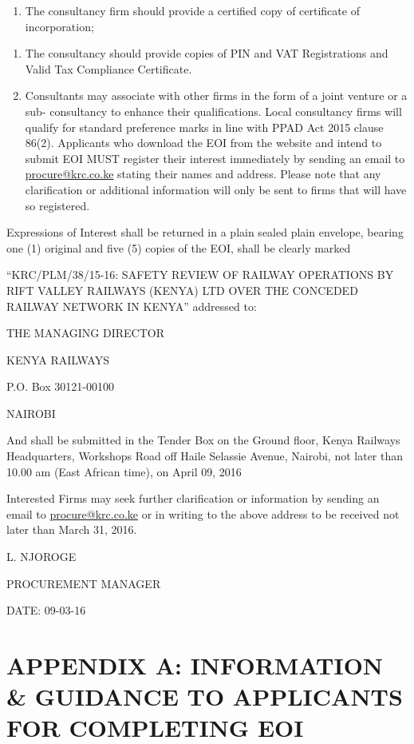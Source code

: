 \begin{enumerate}
	\item 	The consultancy firm should provide a certified copy of certificate of 	incorporation;
\end{enumerate}

\begin{enumerate}
	\item	The consultancy should provide copies of PIN and VAT Registrations and
	Valid Tax Compliance Certificate.
	\item	Consultants may associate with other firms in the form of a joint
	venture or a sub- consultancy to enhance their qualifications. Local
	consultancy firms will qualify for standard preference marks in line
	with PPAD Act 2015 clause 86(2). Applicants who download the EOI from
	the website and intend to submit EOI MUST register their interest
	immediately by sending an email to
	\href{mailto:procure@krc.co.ke}{procure@krc.co.ke} stating their names
	and address. Please note that any clarification or additional
	information will only be sent to firms that will have so registered.
\end{enumerate}

Expressions of Interest shall be returned in a plain sealed plain
envelope, bearing one (1) original and five (5) copies of the EOI, shall
be clearly marked

``KRC/PLM/38/15-16: SAFETY REVIEW OF RAILWAY OPERATIONS BY RIFT VALLEY
RAILWAYS (KENYA) LTD OVER THE CONCEDED RAILWAY NETWORK IN KENYA''
addressed to:

THE MANAGING DIRECTOR

KENYA RAILWAYS

P.O. Box 30121-00100

NAIROBI

And shall be submitted in the Tender Box on the Ground floor, Kenya
Railways Headquarters, Workshops Road off Haile Selassie Avenue,
Nairobi, not later than 10.00 am (East African time), on April 09, 2016

Interested Firms may seek further clarification or information by
sending an email to \href{mailto:procure@krc.co.ke}{procure@krc.co.ke}
or in writing to the above address to be received not later than March
31, 2016.

L. NJOROGE

PROCUREMENT MANAGER

DATE: 09-03-16

\section{APPENDIX A: INFORMATION \& GUIDANCE TO APPLICANTS FOR
	COMPLETING
	EOI}\label{appendix-a-information-guidance-to-applicants-for-completing-eoi}

